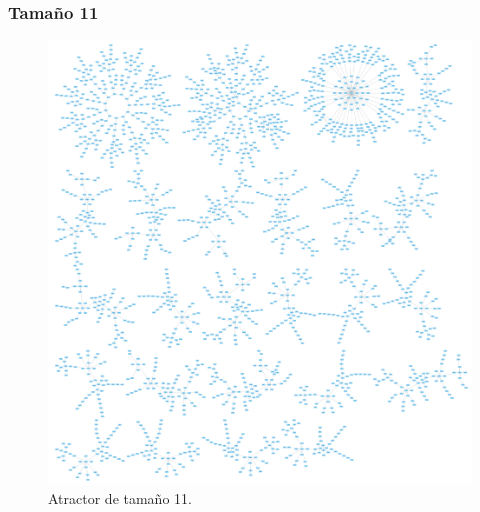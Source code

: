 \documentclass[11pt]{article}
\begin{document}
			\subsubsection{Tamaño 11}
			\begin{figure}[H]
			\centering
			\includegraphics[scale=0.1]{resources/Atractores22/atractor_22_size_11.png}
			\caption{Atractor de tamaño 11.}\label{fig:picture}
			\end{figure}
\end{document}
